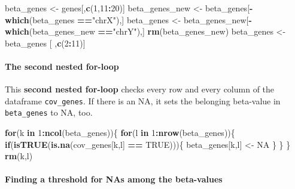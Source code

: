\documentclass[]{article}
\newenvironment{Shaded}{\begin{snugshade}}{\end{snugshade}}
\newcommand{\KeywordTok}[1]{\textcolor[rgb]{0.13,0.29,0.53}{\textbf{#1}}}
\newcommand{\DecValTok}[1]{\textcolor[rgb]{0.00,0.00,0.81}{#1}}
\newcommand{\StringTok}[1]{\textcolor[rgb]{0.31,0.60,0.02}{#1}}
\newcommand{\OtherTok}[1]{\textcolor[rgb]{0.56,0.35,0.01}{#1}}
\newcommand{\ControlFlowTok}[1]{\textcolor[rgb]{0.13,0.29,0.53}{\textbf{#1}}}
\newcommand{\OperatorTok}[1]{\textcolor[rgb]{0.81,0.36,0.00}{\textbf{#1}}}
\newcommand{\NormalTok}[1]{#1}
\let\oldparagraph\paragraph
\renewcommand{\paragraph}[1]{\oldparagraph{#1}\mbox{}}
\begin{document}
\begin{Shaded}
\begin{Highlighting}[]
\NormalTok{beta_genes <-}\StringTok{ }\NormalTok{genes[,}\KeywordTok{c}\NormalTok{(}\DecValTok{1}\NormalTok{,}\DecValTok{11}\OperatorTok{:}\DecValTok{20}\NormalTok{)]}
\NormalTok{beta_genes_new <-}\StringTok{ }\NormalTok{beta_genes[}\OperatorTok{-}\KeywordTok{which}\NormalTok{(beta_genes }\OperatorTok{==}\StringTok{"chrX"}\NormalTok{),]}
\NormalTok{beta_genes <-}\StringTok{ }\NormalTok{beta_genes_new[}\OperatorTok{-}\KeywordTok{which}\NormalTok{(beta_genes_new }\OperatorTok{==}\StringTok{"chrY"}\NormalTok{),]}
\KeywordTok{rm}\NormalTok{(beta_genes_new)}
\NormalTok{beta_genes <-}\StringTok{ }\NormalTok{beta_genes [ ,}\KeywordTok{c}\NormalTok{(}\DecValTok{2}\OperatorTok{:}\DecValTok{11}\NormalTok{)]}
\end{Highlighting}
\end{Shaded}

\paragraph{The second nested for-loop}\label{the-second-nested-for-loop}

This \textbf{second nested for-loop} checks every row and every column
of the dataframe \texttt{cov\_genes}. If there is an NA, it sets the
belonging beta-value in \texttt{beta\_genes} to NA, too.

\begin{Shaded}
\begin{Highlighting}[]
\ControlFlowTok{for}\NormalTok{(k }\ControlFlowTok{in} \DecValTok{1}\OperatorTok{:}\KeywordTok{ncol}\NormalTok{(beta_genes))\{}
  \ControlFlowTok{for}\NormalTok{(l }\ControlFlowTok{in} \DecValTok{1}\OperatorTok{:}\KeywordTok{nrow}\NormalTok{(beta_genes))\{}
    \ControlFlowTok{if}\NormalTok{(}\KeywordTok{isTRUE}\NormalTok{(}\KeywordTok{is.na}\NormalTok{(cov_genes[k,l] }\OperatorTok{==}\StringTok{ }\OtherTok{TRUE}\NormalTok{)))\{}
\NormalTok{      beta_genes[k,l] <-}\StringTok{ }\OtherTok{NA}
\NormalTok{    \} }
\NormalTok{  \}}
\NormalTok{\}}
\KeywordTok{rm}\NormalTok{(k,l)}
\end{Highlighting}
\end{Shaded}

\paragraph{Finding a threshold for NAs among the
beta-values}\label{finding-a-threshold-for-nas-among-the-beta-values}
\end{document}
